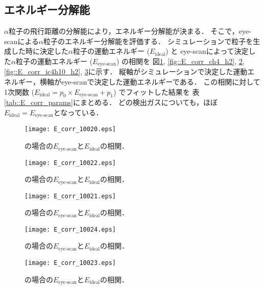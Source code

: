 \documentclass[../master]{subfiles}
\begin{document}
\subsection{エネルギー分解能}
$\alpha$粒子の飛行距離の分解能により，エネルギー分解能が決まる．
そこで，eye-scanによる$\alpha$粒子のエネルギー分解能を評価する．
シミュレーションで粒子を生成した時に決定した$\alpha$粒子の運動エネルギー ($E_{\text{ideal}}$) と
eye-scanによって決定した$\alpha$粒子の運動エネルギー ($E_{\text{eye-scan}}$) の相関を
図\ref{fig::E_corr_ch4}, \ref{fig::E_corr_ch4_h2}, \ref{fig::E_corr_ch4_he},
\ref{fig::E_corr_ic4h10_h2}, \ref{fig::E_corr_ic4h10_he}に示す．
縦軸がシミュレーションで決定した運動エネルギー，横軸がeye-scanで決定した運動エネルギーである．
この相関に対して1次関数 ($E_{\text{ideal}} = p_0\times E_{\text{eye-scan}}+p_1$) でフィットした結果を
表\ref{tab::E_corr_params}にまとめる．
どの検出ガスについても，ほぼ$E_{\text{ideal}} = E_{\text{eye-scan}}$となっている．
\begin{figure}
  \centering
  \begin{minipage}{0.45\columnwidth}
    \centering
    \texttt{[image: E\_corr\_10020.eps]}
    \caption{\Methane の場合の$E_{\text{eye-scan}}$と$E_{\text{ideal}}$の相関．}
    \label{fig::E_corr_ch4}
  \end{minipage}  
\end{figure}
\begin{figure}
  \centering
  \begin{minipage}{0.45\columnwidth}
    \centering
    \texttt{[image: E\_corr\_10022.eps]}
    \caption{\MethaneHydro の場合の$E_{\text{eye-scan}}$と$E_{\text{ideal}}$の相関．}
    \label{fig::E_corr_ch4_h2}
  \end{minipage}
  \begin{minipage}{0.45\columnwidth}
    \centering
    \texttt{[image: E\_corr\_10021.eps]}
    \caption{\MethaneHerium の場合の$E_{\text{eye-scan}}$と$E_{\text{ideal}}$の相関．}
    \label{fig::E_corr_ch4_he}
  \end{minipage}
\end{figure}
\begin{figure}
  \centering
  \begin{minipage}{0.45\columnwidth}
    \centering
    \texttt{[image: E\_corr\_10024.eps]}
    \caption{\isoButaneHydro の場合の$E_{\text{eye-scan}}$と$E_{\text{ideal}}$の相関．}
    \label{fig::E_corr_ic4h10_h2}
  \end{minipage}
  \begin{minipage}{0.45\columnwidth}
    \centering
    \texttt{[image: E\_corr\_10023.eps]}
    \caption{\isoButaneHerium の場合の$E_{\text{eye-scan}}$と$E_{\text{ideal}}$の相関．}
    \label{fig::E_corr_ic4h10_he}
  \end{minipage}
\end{figure}
\end{document}
